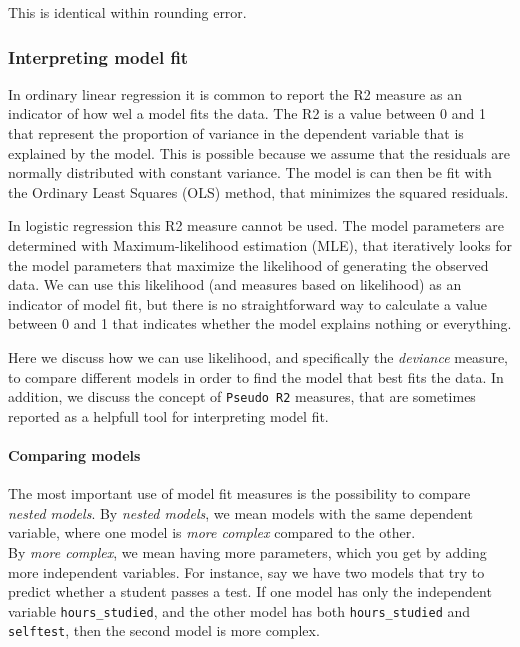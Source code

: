\documentclass[
]{article}
\begin{document}
This is identical within rounding error.

\hypertarget{interpreting-model-fit}{%
\subsubsection{Interpreting model fit}\label{interpreting-model-fit}}

In ordinary linear regression it is common to report the R2 measure as
an indicator of how wel a model fits the data. The R2 is a value between
0 and 1 that represent the proportion of variance in the dependent
variable that is explained by the model. This is possible because we
assume that the residuals are normally distributed with constant
variance. The model is can then be fit with the Ordinary Least Squares
(OLS) method, that minimizes the squared residuals.

In logistic regression this R2 measure cannot be used. The model
parameters are determined with Maximum-likelihood estimation (MLE), that
iteratively looks for the model parameters that maximize the likelihood
of generating the observed data. We can use this likelihood (and
measures based on likelihood) as an indicator of model fit, but there is
no straightforward way to calculate a value between 0 and 1 that
indicates whether the model explains nothing or everything.

Here we discuss how we can use likelihood, and specifically the
\emph{deviance} measure, to compare different models in order to find
the model that best fits the data. In addition, we discuss the concept
of \texttt{Pseudo\ R2} measures, that are sometimes reported as a
helpfull tool for interpreting model fit.

\hypertarget{comparing-models}{%
\paragraph{Comparing models}\label{comparing-models}}

The most important use of model fit measures is the possibility to
compare \emph{nested models}. By \emph{nested models}, we mean models
with the same dependent variable, where one model is \emph{more complex}
compared to the other.\\
By \emph{more complex}, we mean having more parameters, which you get by
adding more independent variables. For instance, say we have two models
that try to predict whether a student passes a test. If one model has
only the independent variable \texttt{hours\_studied}, and the other
model has both \texttt{hours\_studied} and \texttt{selftest}, then the
second model is more complex.
\end{document}
